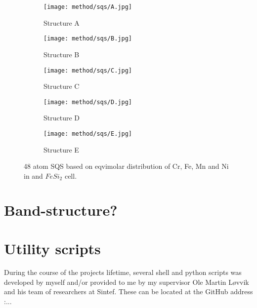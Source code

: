 \begin{figure}
\begin{subfigure}{0.5\textwidth}
\texttt{[image: method/sqs/A.jpg]}
\caption{Structure A}
\end{subfigure}
\hfill
\begin{subfigure}{0.5\textwidth}
\texttt{[image: method/sqs/B.jpg]}
\caption{Structure B}
\end{subfigure}
\begin{subfigure}{0.5\textwidth}
\texttt{[image: method/sqs/C.jpg]}
\caption{Structure C}
\end{subfigure}
\hfill
\begin{subfigure}{0.5\textwidth}
\texttt{[image: method/sqs/D.jpg]}
\caption{Structure D}
\end{subfigure}
\begin{subfigure}{0.5\textwidth}
\texttt{[image: method/sqs/E.jpg]}
\caption{Structure E}
\end{subfigure}
\caption{48 atom SQS based on eqvimolar distribution of Cr, Fe, Mn and Ni in and $FeSi_2$ cell.}
\label{sqs_FeSi2}
\end{figure}

\section{Band-structure?}

\section{Utility scripts}
During the course of the projects lifetime, several shell and python scripts was developed by myself and/or provided to me by my supervisor Ole Martin Løvvik and his team of researchers at Sintef. These can be located at the GitHub address :...